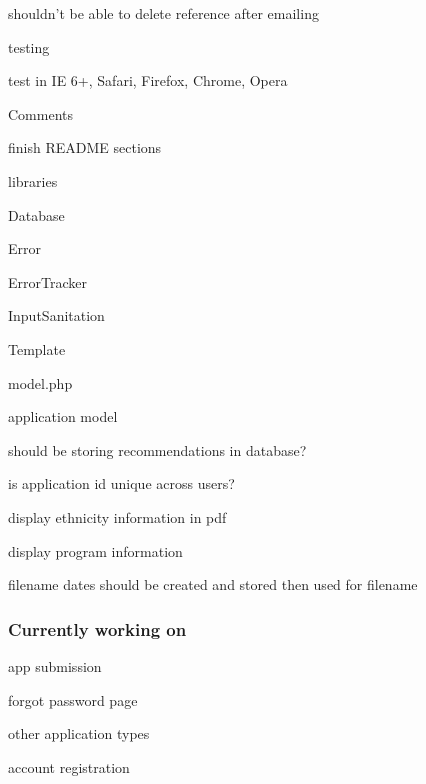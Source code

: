 \begin{DoxyItemize}
\item shouldn't be able to delete reference after emailing
\end{DoxyItemize}


\begin{DoxyItemize}
\item testing
\begin{DoxyItemize}
\item test in I\-E 6+, Safari, Firefox, Chrome, Opera
\end{DoxyItemize}
\end{DoxyItemize}


\begin{DoxyItemize}
\item Comments
\begin{DoxyItemize}
\item finish R\-E\-A\-D\-M\-E sections
\item libraries
\begin{DoxyItemize}
\item Database
\item Error
\item Error\-Tracker
\item Input\-Sanitation
\item Template
\end{DoxyItemize}
\item model.\-php
\item application model
\end{DoxyItemize}
\end{DoxyItemize}


\begin{DoxyItemize}
\item should be storing recommendations in database?
\item is application id unique across users?
\item display ethnicity information in pdf
\item display program information
\item filename dates should be created and stored then used for filename
\end{DoxyItemize}

\subsubsection*{Currently working on}


\begin{DoxyItemize}
\item app submission
\item forgot password page
\item other application types
\item account registration
\end{DoxyItemize}

